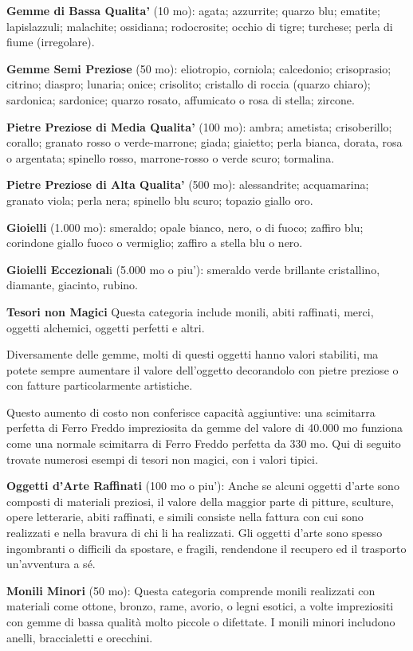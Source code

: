 \documentclass[a4paper,11pt,twoside,openany]{book}
\begin{document}
\textbf{Gemme di Bassa Qualita'} (10 mo): agata; azzurrite; quarzo blu; ematite; lapislazzuli; malachite; ossidiana; rodocrosite; occhio di tigre; turchese; perla di fiume (irregolare).

\textbf{Gemme Semi Preziose} (50 mo): eliotropio, corniola; calcedonio; crisoprasio; citrino; diaspro; lunaria; onice; crisolito; cristallo di roccia (quarzo chiaro); sardonica; sardonice; quarzo rosato, affumicato o rosa di stella; zircone.

\textbf{Pietre Preziose di Media Qualita'} (100 mo): ambra; ametista;
crisoberillo; corallo; granato rosso o verde-marrone; giada; giaietto;
perla bianca, dorata, rosa o argentata; spinello rosso, marrone-rosso
o verde scuro; tormalina.

\textbf{Pietre Preziose di Alta Qualita'} (500 mo): alessandrite; acquamarina; granato viola; perla nera; spinello blu scuro; topazio giallo oro.

\textbf{Gioielli} (1.000 mo): smeraldo; opale bianco, nero, o di fuoco; zaffiro blu; corindone giallo fuoco o vermiglio; zaffiro a stella blu o nero.

\textbf{Gioielli Eccezional}i (5.000 mo o piu'): smeraldo verde brillante cristallino, diamante, giacinto, rubino.

\textbf{Tesori non Magici} Questa categoria include monili, abiti raffinati, merci, oggetti alchemici, oggetti perfetti e altri.

Diversamente delle gemme, molti di questi oggetti hanno valori stabiliti, ma potete sempre aumentare il valore dell'oggetto decorandolo con pietre preziose o con fatture particolarmente artistiche.

Questo aumento di costo non conferisce capacità aggiuntive: una scimitarra perfetta di Ferro Freddo impreziosita da gemme del valore di 40.000 mo funziona come una normale scimitarra di Ferro Freddo perfetta da 330 mo. Qui di seguito trovate numerosi esempi di tesori non magici, con i valori tipici.

\textbf{Oggetti d'Arte Raffinati} (100 mo o piu'): Anche se alcuni oggetti d'arte sono composti di materiali preziosi, il valore della maggior parte di pitture, sculture, opere letterarie, abiti raffinati, e simili consiste nella fattura con cui sono realizzati e nella bravura di chi li ha realizzati. Gli oggetti d'arte sono spesso ingombranti o difficili da spostare, e fragili, rendendone il recupero ed il trasporto un'avventura a sé.

\textbf{Monili Minori} (50 mo): Questa categoria comprende monili realizzati con materiali come ottone, bronzo, rame, avorio, o legni esotici, a volte impreziositi con gemme di bassa qualità molto piccole o difettate. I monili minori includono anelli, braccialetti e orecchini.
\end{document}
